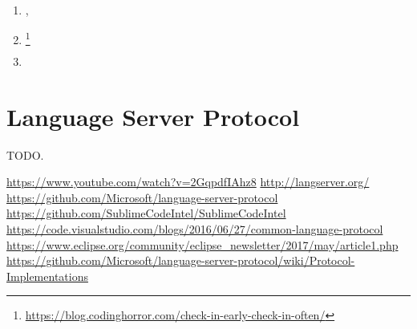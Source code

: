 \begin{enumerate}[leftmargin=*]
    \item {},
    \item \footnote{\url{https://blog.codinghorror.com/check-in-early-check-in-often/}}
    \item \cite{aspectOriented}
\end{enumerate}



\section{Language Server Protocol}

TODO.

\url{https://www.youtube.com/watch?v=2GqpdfIAhz8}
\url{http://langserver.org/}
\url{https://github.com/Microsoft/language-server-protocol}
\url{https://github.com/SublimeCodeIntel/SublimeCodeIntel}
\url{https://code.visualstudio.com/blogs/2016/06/27/common-language-protocol}
\url{https://www.eclipse.org/community/eclipse_newsletter/2017/may/article1.php}
\url{https://github.com/Microsoft/language-server-protocol/wiki/Protocol-Implementations}


